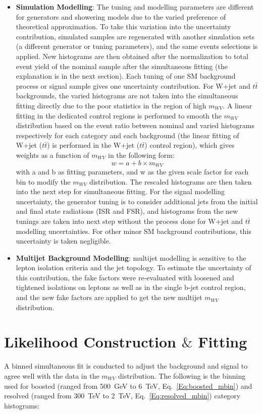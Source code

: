 \begin{itemize}
	\item{\bf Simulation Modelling}: The tuning and modelling parameters are different for generators and showering models due to the varied preference of theoretical approximation. To take this variation into the uncertainty contribution, simulated samples are regenerated with another simulation sets (a different generator or tuning parameters), and the same events selections is applied. New histograms are then obtained after the normalization to total event yield of the nominal sample after the simultaneous fitting (the explanation is in the next section). Each tuning of one SM background process or signal sample gives one uncertainty contribution. For W+jet and $t\bar{t}$ backgrounds, the varied histograms are not taken into the simultaneous fitting directly due to the poor statistics in the region of high $m_{WV}$. A linear fitting in the dedicated control regions is performed to smooth the $m_{WV}$ distribution based on the event ratio between nominal and varied histograms respectively for each category and each background (the linear fitting of W+jet ($t\bar{t}$) is performed in the W+jet ($t\bar{t}$) control region), which gives weights as a function of $m_{WV}$ in the following form:
	\begin{equation}
	w = a + b\times m_{WV}
	\end{equation}
	with a and b as fitting parameters, and w as the given scale factor for each bin to modify the $m_{WV}$ distribution. The rescaled histograms are then taken into the next step for simultaneous fitting. For the signal modelling uncertainty, the generator tuning is to consider additional jets from the initial and final state radiations (ISR and FSR), and histograms from the new tunings are taken into next step without the process done for W+jet and $t\bar{t}$ modelling uncertainties. For other minor SM background contributions, this uncertainty is taken negligible.
	\item{\bf Multijet Background Modelling}: multijet modelling is sensitive to the lepton isolation criteria and the jet topology. To estimate the uncertainty of this contribution, the fake factors were re-evaluated with loosened and tightened isolations on leptons as well as in the single b-jet control region, and the new fake factors are applied to get the new multijet $m_{WV}$ distribution.
\end{itemize}
\section{Likelihood Construction $\&$ Fitting}
A binned simultaneous fit is conducted to adjust the background and signal to agree well with the data in the $m_{WV}$ distribution. The following is the binning used for boosted (ranged from 500~GeV to 6~TeV, Eq.~\ref{Eq:boosted_mbin}) and resolved (ranged from 300~TeV to 2~TeV, Eq.~\ref{Eq:resolved_mbin}) category histograms:

